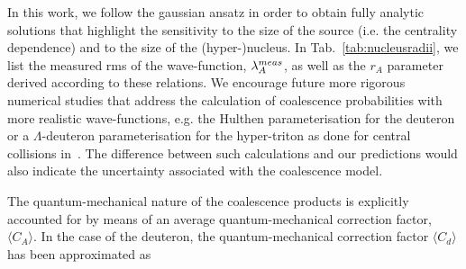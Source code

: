 In this work, we follow the gaussian ansatz in order to obtain fully analytic solutions that highlight the sensitivity to the size of the source (i.e. the centrality dependence) and to the size of the (hyper-)nucleus. 
In Tab.~\ref{tab:nucleusradii}, we list the measured rms of the wave-function, $\lambda_{A}^{meas}$, as well as the $r_{A}$ parameter derived according to these relations. 
We encourage future more rigorous numerical studies that address the calculation of coalescence probabilities with more realistic wave-functions, e.g. the Hulthen parameterisation for the deuteron \cite{Nagle:1996vp} or a $\Lambda$-deuteron parameterisation for the hyper-triton as done for central collisions in~\cite{Zhang:2018euf}. The difference between such calculations and our predictions would also indicate the uncertainty associated with the coalescence model. 

The quantum-mechanical nature of the coalescence products is explicitly accounted for by means of an average quantum-mechanical correction factor, $\langle C_{A} \rangle$. In the case of the deuteron, the quantum-mechanical correction factor $\langle C_{d} \rangle$ has been approximated as 

